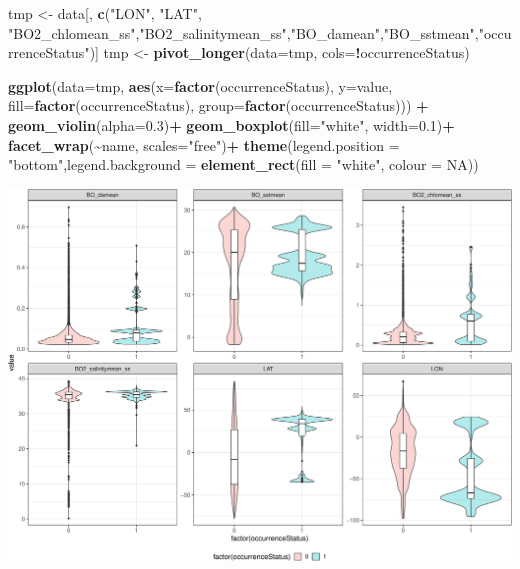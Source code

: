 \documentclass[
]{book}
\newenvironment{Shaded}{\begin{snugshade}}{\end{snugshade}}
\newcommand{\AttributeTok}[1]{\textcolor[rgb]{0.13,0.29,0.53}{#1}}
\newcommand{\ConstantTok}[1]{\textcolor[rgb]{0.56,0.35,0.01}{#1}}
\newcommand{\FloatTok}[1]{\textcolor[rgb]{0.00,0.00,0.81}{#1}}
\newcommand{\FunctionTok}[1]{\textcolor[rgb]{0.13,0.29,0.53}{\textbf{#1}}}
\newcommand{\NormalTok}[1]{#1}
\newcommand{\OtherTok}[1]{\textcolor[rgb]{0.56,0.35,0.01}{#1}}
\newcommand{\SpecialCharTok}[1]{\textcolor[rgb]{0.81,0.36,0.00}{\textbf{#1}}}
\newcommand{\StringTok}[1]{\textcolor[rgb]{0.31,0.60,0.02}{#1}}
\begin{document}
\begin{Shaded}
\begin{Highlighting}[]
\NormalTok{tmp }\OtherTok{\textless{}{-}}\NormalTok{ data[, }\FunctionTok{c}\NormalTok{(}\StringTok{"LON"}\NormalTok{, }\StringTok{"LAT"}\NormalTok{, }\StringTok{"BO2\_chlomean\_ss"}\NormalTok{,}\StringTok{"BO2\_salinitymean\_ss"}\NormalTok{,}\StringTok{"BO\_damean"}\NormalTok{,}\StringTok{"BO\_sstmean"}\NormalTok{,}\StringTok{"occurrenceStatus"}\NormalTok{)]}
\NormalTok{tmp }\OtherTok{\textless{}{-}} \FunctionTok{pivot\_longer}\NormalTok{(}\AttributeTok{data=}\NormalTok{tmp, }\AttributeTok{cols=}\SpecialCharTok{!}\NormalTok{occurrenceStatus) }

\FunctionTok{ggplot}\NormalTok{(}\AttributeTok{data=}\NormalTok{tmp, }\FunctionTok{aes}\NormalTok{(}\AttributeTok{x=}\FunctionTok{factor}\NormalTok{(occurrenceStatus), }\AttributeTok{y=}\NormalTok{value, }\AttributeTok{fill=}\FunctionTok{factor}\NormalTok{(occurrenceStatus), }\AttributeTok{group=}\FunctionTok{factor}\NormalTok{(occurrenceStatus))) }\SpecialCharTok{+} 
  \FunctionTok{geom\_violin}\NormalTok{(}\AttributeTok{alpha=}\FloatTok{0.3}\NormalTok{)}\SpecialCharTok{+}
  \FunctionTok{geom\_boxplot}\NormalTok{(}\AttributeTok{fill=}\StringTok{"white"}\NormalTok{, }\AttributeTok{width=}\FloatTok{0.1}\NormalTok{)}\SpecialCharTok{+}
  \FunctionTok{facet\_wrap}\NormalTok{(}\SpecialCharTok{\textasciitilde{}}\NormalTok{name, }\AttributeTok{scales=}\StringTok{"free"}\NormalTok{)}\SpecialCharTok{+}
  \FunctionTok{theme}\NormalTok{(}\AttributeTok{legend.position =} \StringTok{"bottom"}\NormalTok{,}\AttributeTok{legend.background =} \FunctionTok{element\_rect}\NormalTok{(}\AttributeTok{fill =} \StringTok{"white"}\NormalTok{, }\AttributeTok{colour =} \ConstantTok{NA}\NormalTok{))}
\end{Highlighting}
\end{Shaded}

\includegraphics{_main_files/figure-latex/unnamed-chunk-49-1.pdf}
\end{document}
